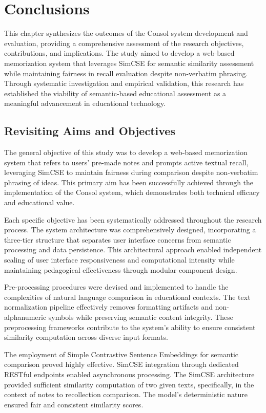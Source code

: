 \chapter{Conclusions}
\label{chap:conclusions}

{\color{maroon}
This chapter synthesizes the outcomes of the Consol system development and evaluation, providing a comprehensive assessment of the research objectives, contributions, and implications. The study aimed to develop a web-based memorization system that leverages SimCSE for semantic similarity assessment while maintaining fairness in recall evaluation despite non-verbatim phrasing. Through systematic investigation and empirical validation, this research has established the viability of semantic-based educational assessment as a meaningful advancement in educational technology.

\section{Revisiting Aims and Objectives}

The general objective of this study was to develop a web-based memorization system that refers to users' pre-made notes and prompts active textual recall, leveraging SimCSE to maintain fairness during comparison despite non-verbatim phrasing of ideas. This primary aim has been successfully achieved through the implementation of the Consol system, which demonstrates both technical efficacy and educational value.

Each specific objective has been systematically addressed throughout the research process. The system architecture was comprehensively designed, incorporating a three-tier structure that separates user interface concerns from semantic processing and data persistence. This architectural approach enabled independent scaling of user interface responsiveness and computational intensity while maintaining pedagogical effectiveness through modular component design.

Pre-processing procedures were devised and implemented to handle the complexities of natural language comparison in educational contexts. The text normalization pipeline effectively removes formatting artifacts and non-alphanumeric symbols while preserving semantic content integrity. These preprocessing frameworks contribute to the system's ability to ensure consistent similarity computation across diverse input formats.

The employment of Simple Contrastive Sentence Embeddings for semantic comparison proved highly effective. SimCSE integration through dedicated RESTful endpoints enabled asynchronous processing. The SimCSE architecture provided sufficient similarity computation of two given texts, specifically, in the context of notes to recollection comparison. The model's deterministic nature ensured fair and consistent similarity scores.

}
